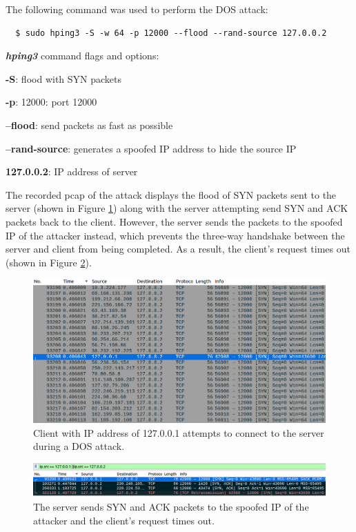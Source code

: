 \documentclass[11pt]{article}
\begin{document}
The following command was used to perform the DOS attack:
\begin{verbatim}
  $ sudo hping3 -S -w 64 -p 12000 --flood --rand-source 127.0.0.2
\end{verbatim}
\textbf{\emph{hping3}} command flags and options:

\textbf{-S}: flood with SYN packets

\textbf{-p}: 12000: port 12000

\textbf{--flood}: send packets as fast as possible

\textbf{--rand-source}: generates a spoofed IP address to hide the source IP

\textbf{127.0.0.2}: IP address of server
\newline

The recorded pcap of the attack displays the flood of SYN packets sent to the server (shown in Figure \ref{fig:client-attempt-flood})
along with the server attempting send SYN and ACK packets back to the client.
However, the server sends the packets to the spoofed IP of the attacker instead,
which prevents the three-way handshake between the server and client from being completed.
As a result, the client's request times out (shown in Figure \ref{fig:filtered-dos}).

\begin{figure}[h]
\centering
\includegraphics[width=.9\linewidth]{./client-attempt-flood.png}
\caption{\label{fig:client-attempt-flood}
Client with IP address of 127.0.0.1 attempts to connect to the server during a DOS attack.}
\end{figure}

\begin{figure}[h]
\centering
\includegraphics[width=.9\linewidth]{./filtered-dos.png}
\caption{\label{fig:filtered-dos}
The server sends SYN and ACK packets to the spoofed IP of the attacker and the client's request times out.}
\end{figure}
\end{document}
